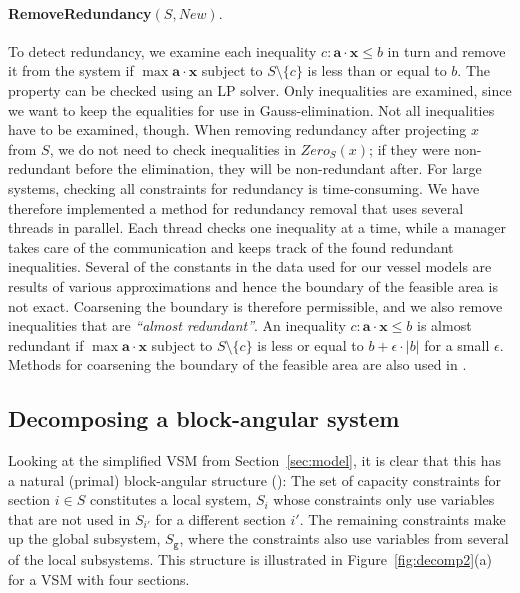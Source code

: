 \documentclass{llncs}
\newcommand{\mi}{\mathit}
\newcommand{\ve}{\mathbf}
\begin{document}
\paragraph{{\sc RemoveRedundancy}$(S,\mathit{New}).$} To detect redundancy, we examine each inequality $c: \ve{a}\cdot \ve{x}\leq b$ in turn and remove it from the system if $\max \ve{a}\cdot \ve{x}$ subject to $S\setminus\{c\}$ is less than or equal to $b$. The property can be checked using an LP solver. Only inequalities are examined, since we want to keep the equalities for use in Gauss-elimination. Not all inequalities have to be examined, though. When removing redundancy after projecting $x$ from $S$, we do not need to check inequalities in $\mi{Zero}_S(x)$; if they were non-redundant before the elimination, they will be non-redundant after. For large systems, checking all constraints for redundancy is time-consuming. We have therefore implemented a method for redundancy removal that uses several threads in parallel. Each thread checks one inequality at a time, while a manager takes care of the communication and keeps track of the found redundant inequalities. 
Several of the constants in the data used for our vessel models are results of various approximations and hence the boundary of the feasible area is not exact. Coarsening the boundary is therefore permissible, and we also remove inequalities that are \emph{``almost redundant''}. An inequality $c: \ve{a}\cdot\ve{x}\leq b$ is almost redundant if $\max \ve{a}\cdot\ve{x}$ subject to $S\setminus\{c\}$ is less or equal to $b + \epsilon\cdot |b|$ for a small $\epsilon$. Methods for coarsening the boundary of the feasible area are also used in \cite{lukatskii08,shapot12}.

\subsection{Decomposing a block-angular system}\label{sec:decomp}
Looking at the simplified VSM from Section~\ref{sec:model}, it is clear that this has a natural (primal) block-angular structure (\cite{williams}): The set of capacity constraints for section $i\in S$ constitutes a local system, $S_i$ whose constraints only use variables that are not used in $S_{i'}$ for a different section $i'$. The remaining constraints make up the global subsystem, $S_\texttt{g}$, where the constraints also use variables from several of the local subsystems. This structure is illustrated in Figure~\ref{fig:decomp2}(a) for a VSM with four sections. 
\end{document}
